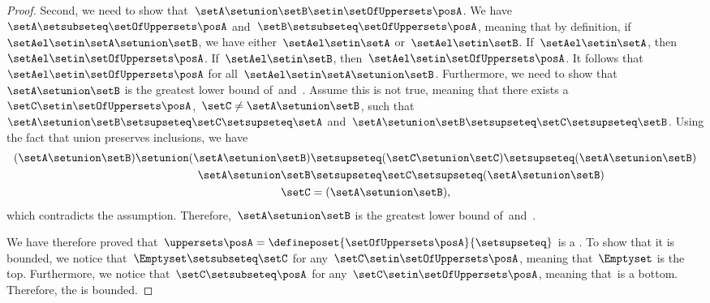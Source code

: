 \begin{proof}
    Second, we need to show that~$\setA\setunion \setB\setin \setOfUppersets \posA$.
    We have~$\setA\setsubseteq \setOfUppersets \posA$ and~$\setB \setsubseteq \setOfUppersets \posA$, meaning that by definition, if~$\setAel\setin \setA\setunion \setB$, we have either~$\setAel\setin \setA$ or~$\setAel\setin \setB$.
    If~$\setAel\setin \setA$, then~$\setAel\setin \setOfUppersets \posA$.
    If~$\setAel\setin \setB$, then~$\setAel \setin \setOfUppersets \posA$.
    It follows that~$\setAel \setin \setOfUppersets \posA$ for all~$\setAel\setin \setA\setunion \setB$.
    Furthermore, we need to show that~$\setA\setunion \setB$ is the greatest lower bound of~\setA and~\setB.
    Assume this is not true, meaning that there exists a~$\setC\setin \setOfUppersets \posA$,~$\setC\neq \setA\setunion \setB$, such that~$\setA\setunion \setB\setsupseteq \setC\setsupseteq \setA$ and~$\setA\setunion \setB\setsupseteq \setC\setsupseteq \setB$.
    Using the fact that union preserves inclusions, we have
    \begin{equation}
        \begin{aligned}
            (\setA\setunion \setB)
            \setunion (\setA\setunion \setB) & \setsupseteq (\setC \setunion \setC) \setsupseteq (\setA\setunion \setB) \\
            \setA\setunion \setB             & \setsupseteq \setC\setsupseteq (\setA\setunion \setB ) \\
            \setC                            & =(\setA\setunion \setB),
        \end{aligned}
    \end{equation}
    which contradicts the assumption.
    Therefore,~$\setA\setunion \setB$ is the greatest lower bound of~\setA and~\setB.

    We have therefore proved that~$\uppersets \posA=\defineposet{\setOfUppersets \posA}{\setsupseteq}$ is a .
    To show that it is bounded, we notice that~$\Emptyset \setsubseteq \setC$ for any~$\setC\setin \setOfUppersets \posA$, meaning that~$\Emptyset$ is the top.
    Furthermore, we notice that~$\setC\setsubseteq \posA$ for any~$\setC\setin \setOfUppersets \posA$, meaning that~\posA is a bottom.
    Therefore, the  is bounded.
\end{proof}

